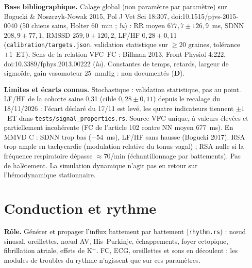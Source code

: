 \documentclass[10pt,a4paper]{article}
\newcommand{\cmd}[1]{\texttt{#1}}
\newcommand{\evD}{\textcolor{red!70!black}{\textbf{D}}}
\newcommand{\acc}[1]{\textsl{#1}}
\newcommand{\limite}[1]{\par\textbf{Limites et écarts connus.} #1}
\newcommand{\sources}[1]{\par\textbf{Base bibliographique.} #1}
\begin{document}
\sources{Calage global (non paramètre par paramètre) sur Bogucki \& Noszczyk-Nowak 2015, Pol J Vet Sci 18:307, doi:10.1515/pjvs-2015-0040 (50 chiens sains, Holter 60~min ; \acc{lu}) : RR moyen $677{,}7 \pm 126{,}9$~ms, SDNN $208{,}9 \pm 77{,}1$, RMSSD $259{,}0 \pm 120{,}2$, LF/HF $0{,}28 \pm 0{,}11$ (\cmd{calibration/targets.json}, validation statistique sur $\ge 20$ graines, tolérance $\pm 1$~ET). Sens de la relation VFC--FC : Billman 2013, Front Physiol 4:222, doi:10.3389/fphys.2013.00222 (\acc{lu}). Constantes de temps, retards, largeur de sigmoïde, gain vasomoteur 25~mmHg : non documentés (\evD{}).}

\limite{Stochastique : validation statistique, pas au point. LF/HF de la cohorte saine 0,31 (cible $0{,}28 \pm 0{,}11$) depuis le recalage du 18/11/2026 : l'écart déclaré du 17/11 est levé, les quatre indicateurs tiennent $\pm 1$~ET dans \cmd{tests/signal\_properties.rs}. Source VFC unique, à valeurs élevées et partiellement incohérente (FC de l'article 102 contre NN moyen 677~ms). En MMVD C : SDNN trop bas ($-54$~ms), LF/HF sans hausse (Bogucki 2017). RSA trop ample en tachycardie (modulation relative du tonus vagal) ; RSA nulle si la fréquence respiratoire dépasse $\approx 70$/min (échantillonnage par battements). Pas de halètement. La simulation dynamique n'agit pas en retour sur l'hémodynamique stationnaire.}

\section{Conduction et rythme}\label{sec:rythme}

\textbf{Rôle.} Générer et propager l'influx battement par battement (\cmd{rhythm.rs}) : nœud sinusal, oreillettes, nœud AV, His--Purkinje, échappements, foyer ectopique, fibrillation atriale, effets de K$^+$. FC, ECG, oreillettes et sons en découlent ; les modules de troubles du rythme n'agissent que sur ces paramètres.
\end{document}
